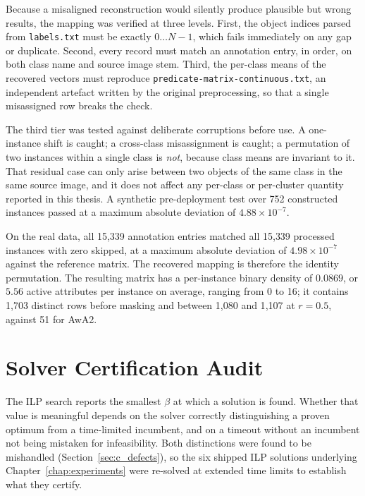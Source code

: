 Because a misaligned reconstruction would silently produce plausible but wrong results, the mapping was verified at three levels. First, the object indices parsed from \texttt{labels.txt} must be exactly $0 \ldots N-1$, which fails immediately on any gap or duplicate. Second, every record must match an annotation entry, in order, on both class name and source image stem. Third, the per-class means of the recovered vectors must reproduce \texttt{predicate-matrix-continuous.txt}, an independent artefact written by the original preprocessing, so that a single misassigned row breaks the check.

The third tier was tested against deliberate corruptions before use. A one-instance shift is caught; a cross-class misassignment is caught; a permutation of two instances within a single class is \emph{not}, because class means are invariant to it. That residual case can only arise between two objects of the same class in the same source image, and it does not affect any per-class or per-cluster quantity reported in this thesis. A synthetic pre-deployment test over 752 constructed instances passed at a maximum absolute deviation of $4.88 \times 10^{-7}$.

On the real data, all 15{,}339 annotation entries matched all 15{,}339 processed instances with zero skipped, at a maximum absolute deviation of $4.98 \times 10^{-7}$ against the reference matrix. The recovered mapping is therefore the identity permutation. The resulting matrix has a per-instance binary density of $0.0869$, or $5.56$ active attributes per instance on average, ranging from 0 to 16; it contains 1{,}703 distinct rows before masking and between 1{,}080 and 1{,}107 at $r = 0.5$, against 51 for AwA2.

\section{Solver Certification Audit}
\label{sec:c_certification}

The ILP search reports the smallest $\beta$ at which a solution is found. Whether that value is meaningful depends on the solver correctly distinguishing a proven optimum from a time-limited incumbent, and on a timeout without an incumbent not being mistaken for infeasibility. Both distinctions were found to be mishandled (Section~\ref{sec:c_defects}), so the six shipped ILP solutions underlying Chapter~\ref{chap:experiments} were re-solved at extended time limits to establish what they certify.

